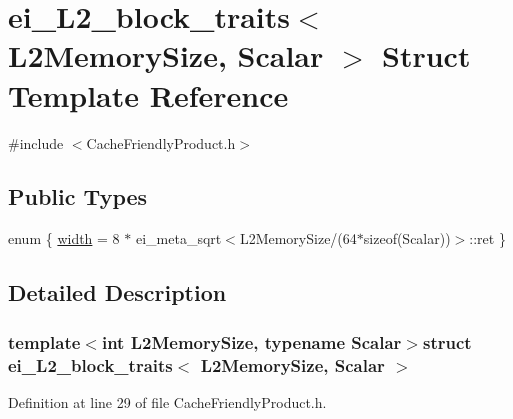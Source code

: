 \hypertarget{structei___l2__block__traits}{\section{ei\-\_\-\-L2\-\_\-block\-\_\-traits$<$ L2\-Memory\-Size, Scalar $>$ Struct Template Reference}
\label{structei___l2__block__traits}
}


{\ttfamily \#include $<$Cache\-Friendly\-Product.\-h$>$}

\subsection*{Public Types}
\begin{DoxyCompactItemize}
\item 
enum \{ \hyperlink{structei___l2__block__traits_a6e111d07131243e63afb82888a6a7fb9a5ce63fecdba0398317452589d176d76e}{width} = 8 $\ast$ ei\-\_\-meta\-\_\-sqrt$<$L2\-Memory\-Size/(64$\ast$sizeof(Scalar))$>$\-:\-:ret
 \}
\end{DoxyCompactItemize}


\subsection{Detailed Description}
\subsubsection*{template$<$int L2\-Memory\-Size, typename Scalar$>$struct ei\-\_\-\-L2\-\_\-block\-\_\-traits$<$ L2\-Memory\-Size, Scalar $>$}



Definition at line 29 of file Cache\-Friendly\-Product.\-h.



